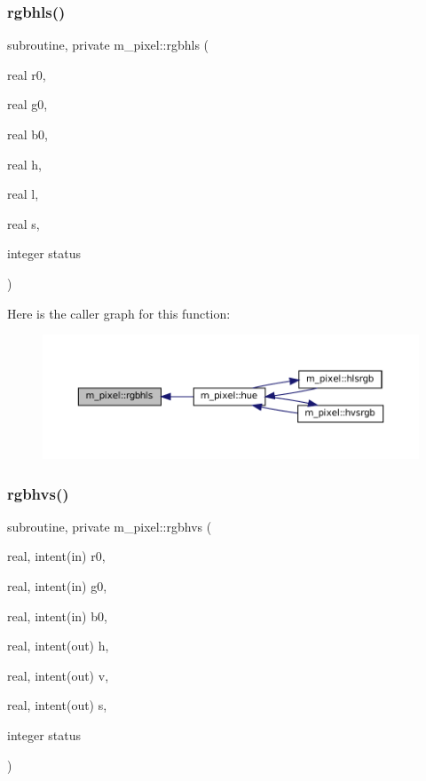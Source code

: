 \subsubsection{\texorpdfstring{rgbhls()}{rgbhls()}}
{\footnotesize\ttfamily subroutine, private m\+\_\+pixel\+::rgbhls (\begin{DoxyParamCaption}\item[{real}]{r0,  }\item[{real}]{g0,  }\item[{real}]{b0,  }\item[{real}]{h,  }\item[{real}]{l,  }\item[{real}]{s,  }\item[{integer}]{status }\end{DoxyParamCaption})\hspace{0.3cm}{\ttfamily [private]}}

Here is the caller graph for this function\+:
\nopagebreak
\begin{figure}[H]
\begin{center}
\leavevmode
\includegraphics[width=350pt]{namespacem__pixel_a02bb73b68aeae5056ccf76868146b1b4_icgraph}
\end{center}
\end{figure}
\mbox{\label{namespacem__pixel_a07ffb197bdcd075f5375e95b43c18915}} 
\subsubsection{\texorpdfstring{rgbhvs()}{rgbhvs()}}
{\footnotesize\ttfamily subroutine, private m\+\_\+pixel\+::rgbhvs (\begin{DoxyParamCaption}\item[{real, intent(in)}]{r0,  }\item[{real, intent(in)}]{g0,  }\item[{real, intent(in)}]{b0,  }\item[{real, intent(out)}]{h,  }\item[{real, intent(out)}]{v,  }\item[{real, intent(out)}]{s,  }\item[{integer}]{status }\end{DoxyParamCaption})\hspace{0.3cm}{\ttfamily [private]}}

